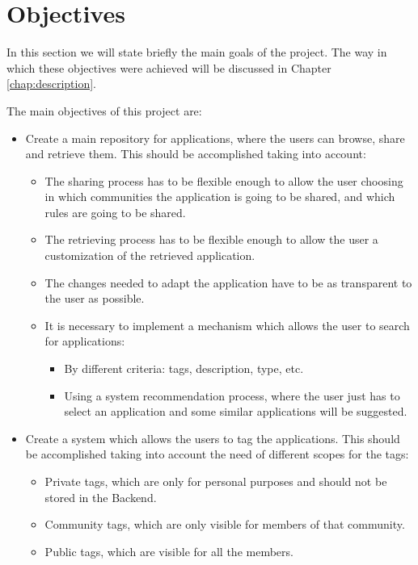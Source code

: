 \chapter{Objectives}
\label{chap:objectives}

In this section we will state briefly the main goals of the project. The way in
which these objectives were achieved will be discussed in Chapter
\ref{chap:description}.
\par

The main objectives of this project are:

\begin{itemize}
  \item Create a main repository for applications, where the users can browse,
  share and retrieve them. This should be accomplished taking into account:
  \begin{itemize}
    \item The sharing process has to be flexible enough to allow the user
    choosing in which communities the application is going to be shared, and
    which rules are going to be shared.
    \item The retrieving process has to be flexible enough to allow the user a
    customization of the retrieved application. 
    \item The changes needed to adapt the application have to be as transparent
    to the user as possible.
    \item It is necessary to implement a mechanism which allows the user to
    search for applications:
      \begin{itemize}
        \item By different criteria: tags, description, type, etc.
        \item Using a system recommendation process, where the user just has to
        select an application and some similar applications will be suggested.
      \end{itemize}
  \end{itemize}
  
  \item Create a system which allows the users to tag the applications. This
  should be accomplished taking into account the need of different scopes for
  the tags:
  \begin{itemize}
    \item Private tags, which are only for personal purposes and should not be
    stored in the Backend.
    \item Community tags, which are only visible for members of that community.
    \item Public tags, which are visible for all the members.
  \end{itemize}
  

\end{itemize}
